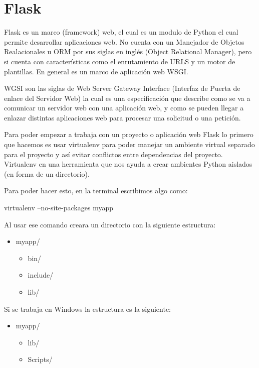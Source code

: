 \documentclass[12pt, a4paper, titlepage]{report}
\begin{document}
		\section{Flask}
		Flask es un marco (framework) web, el cual es un modulo de Python el cual permite desarrollar aplicaciones web. No cuenta con un Manejador de Objetos Realacionales u ORM por sus siglas en inglés (Object Relational Manager), pero si cuenta con características como el enrutamiento de URLS y un motor de plantillas. En general es un marco de aplicación web WSGI.\cite{refFlask3}\par
		WGSI son las siglas de Web Server Gateway Interface (Interfaz de Puerta de enlace del Servidor Web) la cual es una especificación que describe como se va a comunicar un servidor web con una aplicación web, y como se pueden llegar a enlazar distintas aplicaciones web para procesar una solicitud o una petición.\cite{refFlask2}\par
		Para poder empezar a trabaja con un proyecto o aplicación web Flask lo primero que hacemos es usar virtualenv para poder manejar un ambiente virtual separado para el proyecto y así evitar conflictos entre dependencias del proyecto. Virtualenv en una herramienta que nos ayuda a crear ambientes Python aislados (en forma de un directorio).\par
		Para poder hacer esto, en la terminal escribimos algo como:\par
		\begin{center}
		virtualenv --no-site-packages myapp\par
		\end{center}
		Al usar ese comando creara un directorio con la siguiente estructura:\par
		\begin{itemize}
		    \item myapp/
		    \begin{itemize}
		        \item bin/
		        \item include/
		        \item lib/
		    \end{itemize}
		\end{itemize}
		Si se trabaja en Windows la estructura es la siguiente:\par
		\begin{itemize}
		    \item myapp/
		    \begin{itemize}
		        \item lib/
		        \item Scripts/
		    \end{itemize}
		\end{itemize}
\end{document}
